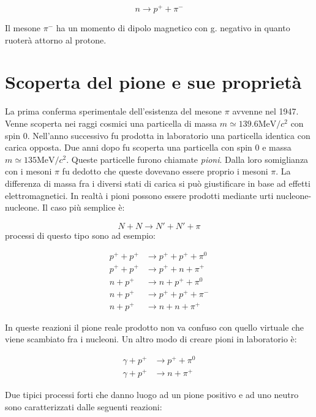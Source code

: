 \begin{equation*}
n \to p^+ + \pi^-
\end{equation*}

Il mesone $\pi^-$ ha un momento di dipolo magnetico con g. negativo in quanto
ruoterà attorno al protone.

\section{Scoperta del pione e sue proprietà}
La prima conferma sperimentale dell'esistenza del mesone $\pi$ avvenne nel 1947.
Venne scoperta nei raggi cosmici una particella di massa $m \simeq 139.6
\text{MeV}/c^2$ con spin $0$. Nell'anno successivo fu prodotta in laboratorio una
particella identica con carica opposta. Due anni dopo fu scoperta una particella
con spin $0$ e massa $m \simeq 135 \text{MeV}/c^2$. Queste particelle furono chiamate
\textit{pioni}. Dalla loro somiglianza con i mesoni $\pi$ fu dedotto che queste
dovevano essere proprio i mesoni $\pi$. La differenza di massa fra i diversi
stati di carica si può giustificare in base ad effetti elettromagnetici. In
realtà i pioni possono essere prodotti mediante urti nucleone-nucleone. Il caso
più semplice è:

\begin{equation*}
N + N \to N' + N' + \pi
\end{equation*}
processi di questo tipo sono ad esempio:

\begin{align*}
p^+ + p^+ &\to p^+ + p^+ + \pi^0 \\
p^+ + p^+ &\to p^+ + n + \pi^+ \\
n + p^+ &\to n + p^+ + \pi^0 \\
n + p^+ &\to p^+ + p^+ + \pi^- \\
n + p^+ &\to n + n + \pi^+
\end{align*}

In queste reazioni il pione reale prodotto non va confuso con quello virtuale
che viene scambiato fra i nucleoni. Un altro modo di creare pioni in laboratorio è:

\begin{align*}
\gamma + p^+ &\to p^+ + \pi^0 \\
\gamma + p^+ &\to n + \pi^+
\end{align*}

Due  tipici processi forti che danno luogo ad un pione
positivo e ad uno neutro sono caratterizzati dalle seguenti reazioni:

